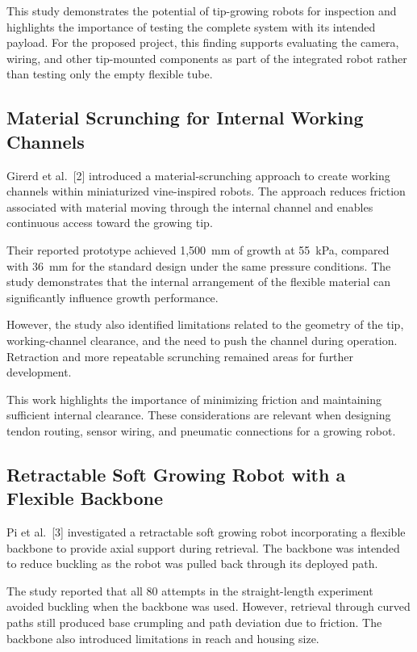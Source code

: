 This study demonstrates the potential of tip-growing robots for inspection and highlights the importance of testing the complete system with its intended payload. For the proposed project, this finding supports evaluating the camera, wiring, and other tip-mounted components as part of the integrated robot rather than testing only the empty flexible tube.

\subsection{Material Scrunching for Internal Working Channels}

Girerd et al.~[2] introduced a material-scrunching approach to create working channels within miniaturized vine-inspired robots. The approach reduces friction associated with material moving through the internal channel and enables continuous access toward the growing tip.

Their reported prototype achieved 1,500~mm of growth at 55~kPa, compared with 36~mm for the standard design under the same pressure conditions. The study demonstrates that the internal arrangement of the flexible material can significantly influence growth performance.

However, the study also identified limitations related to the geometry of the tip, working-channel clearance, and the need to push the channel during operation. Retraction and more repeatable scrunching remained areas for further development.

This work highlights the importance of minimizing friction and maintaining sufficient internal clearance. These considerations are relevant when designing tendon routing, sensor wiring, and pneumatic connections for a growing robot.

\subsection{Retractable Soft Growing Robot with a Flexible Backbone}

Pi et al.~[3] investigated a retractable soft growing robot incorporating a flexible backbone to provide axial support during retrieval. The backbone was intended to reduce buckling as the robot was pulled back through its deployed path.

The study reported that all 80 attempts in the straight-length experiment avoided buckling when the backbone was used. However, retrieval through curved paths still produced base crumpling and path deviation due to friction. The backbone also introduced limitations in reach and housing size.

